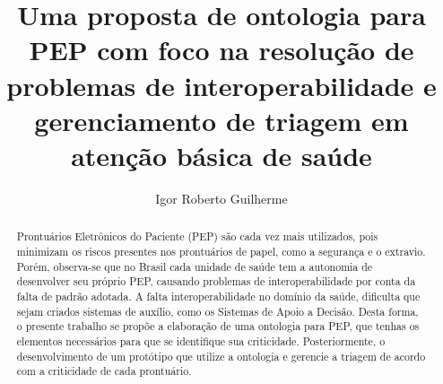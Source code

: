 \documentclass[sigconf]{acmart}
\begin{document}
\title{Uma proposta de ontologia para PEP com foco na resolução de problemas de interoperabilidade e gerenciamento de triagem em atenção básica de saúde}



\author{Igor Roberto Guilherme}


\begin{abstract}
Prontuários Eletrônicos do Paciente (PEP) são cada vez mais utilizados, pois minimizam os riscos presentes nos prontuários de papel, como a segurança e o extravio. Porém, observa-se que no Brasil cada unidade de saúde tem a autonomia de desenvolver seu próprio PEP, causando problemas de interoperabilidade por conta da falta de padrão adotada. A falta interoperabilidade no domínio da saúde, dificulta que sejam criados sistemas de auxílio, como os Sistemas de Apoio a Decisão. Desta forma, o presente trabalho se propõe a elaboração de uma ontologia para PEP, que tenhas os elementos necessários para que se identifique sua criticidade. Posteriormente, o desenvolvimento de um protótipo que utilize a ontologia e gerencie a triagem de acordo com a criticidade de cada prontuário.   
 \end{abstract}

%
%




\maketitle





\end{document}
